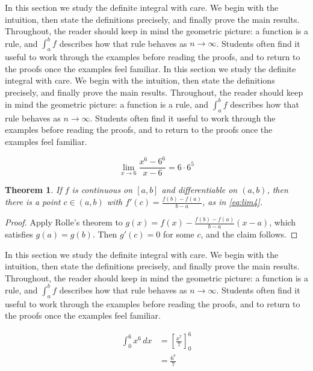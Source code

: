 \documentclass[11pt]{article}
\newtheorem{theorem}{Theorem}[section]
\begin{document}
In this section we study the definite integral with care. We begin with the intuition, then state the definitions precisely, and finally prove the main results. Throughout, the reader should keep in mind the geometric picture: a function is a rule, and $\int_a^b f$ describes how that rule behaves as $n \to \infty$. Students often find it useful to work through the examples before reading the proofs, and to return to the proofs once the examples feel familiar. In this section we study the definite integral with care. We begin with the intuition, then state the definitions precisely, and finally prove the main results. Throughout, the reader should keep in mind the geometric picture: a function is a rule, and $\int_a^b f$ describes how that rule behaves as $n \to \infty$. Students often find it useful to work through the examples before reading the proofs, and to return to the proofs once the examples feel familiar. 

\begin{equation}
  \lim_{x \to 6} \frac{x^{6} - 6^{6}}{x - 6} = 6 \cdot 6^{5}
  \label{eq:lim4}
\end{equation}

\begin{theorem}
If $f$ is continuous on $[a,b]$ and differentiable on $(a,b)$, then there is a point $c \in (a,b)$ with $f'(c) = \frac{f(b)-f(a)}{b-a}$, as in \eqref{eq:lim4}.
\end{theorem}

\begin{proof}
Apply Rolle's theorem to $g(x) = f(x) - \frac{f(b)-f(a)}{b-a}(x-a)$, which satisfies $g(a) = g(b)$. Then $g'(c) = 0$ for some $c$, and the claim follows.
\end{proof}

In this section we study the definite integral with care. We begin with the intuition, then state the definitions precisely, and finally prove the main results. Throughout, the reader should keep in mind the geometric picture: a function is a rule, and $\int_a^b f$ describes how that rule behaves as $n \to \infty$. Students often find it useful to work through the examples before reading the proofs, and to return to the proofs once the examples feel familiar. 

\begin{align}
  \int_0^{6} x^{6}\,dx &= \left[ \frac{x^{7}}{7} \right]_0^{6} \\
  &= \frac{6^{7}}{7} \label{eq:int4}
\end{align}
\end{document}
